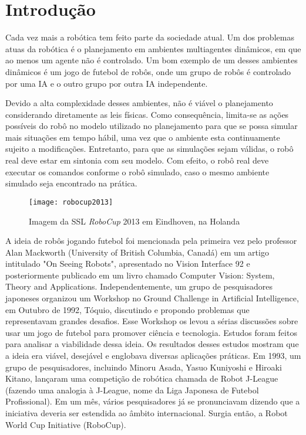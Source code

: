 \chapter{Introdução}

Cada vez mais a robótica tem feito parte da sociedade atual. Um dos problemas
atuas da robótica é o planejamento em ambientes multiagentes dinâmicos, em que
ao menos um agente não é controlado. Um bom exemplo de um desses ambientes
dinâmicos é um jogo de futebol de robôs, onde um grupo de robôs é controlado por
uma IA e o outro grupo por outra IA independente.

Devido a alta complexidade desses ambientes, não é viável o planejamento
considerando diretamente as leis físicas. Como consequência, limita-se as ações
possíveis do robô no modelo utilizado no planejamento para que se possa simular
mais situações em tempo hábil, uma vez que o ambiente esta continuamente sujeito
a modificações. Entretanto, para que as simulações sejam válidas, o robô real
deve estar em sintonia com seu modelo. Com efeito, o robô real deve executar os
comandos conforme o robô simulado, caso o mesmo ambiente simulado seja
encontrado na prática.

\begin{figure}
  \centering
  \texttt{[image: robocup2013]}
  \caption{Imagem da SSL \textit{RoboCup} 2013 em Eindhoven, na Holanda}\label{fig:robocup2013}
\end{figure}

A ideia de robôs jogando futebol foi mencionada pela primeira vez pelo professor
Alan Mackworth (University of British Columbia, Canadá) em um artigo intitulado
"On Seeing Robots", apresentado no Vision Interface 92 e posteriormente
publicado em um livro chamado Computer Vision: System, Theory and Applications.
Independentemente, um grupo de pesquisadores japoneses organizou um Workshop no
Ground Challenge in Artificial Intelligence, em Outubro de 1992, Tóquio,
discutindo e propondo problemas que representavam grandes desafios. Esse
Workshop os levou a sérias discussões sobre usar um jogo de futebol para
promover ciência e tecnologia. Estudos foram feitos para analisar a viabilidade
dessa ideia. Os resultados desses estudos mostram que a ideia era viável,
desejável e englobava diversas aplicações práticas. Em 1993, um grupo de
pesquisadores, incluindo Minoru Asada, Yasuo Kuniyoshi e Hiroaki Kitano,
lançaram uma competição de robótica chamada de Robot J-League (fazendo uma
analogia à J-League, nome da Liga Japonesa de Futebol Profissional). Em um mês,
vários pesquisadores já se pronunciavam dizendo que a iniciativa deveria ser
estendida ao âmbito internacional. Surgia então, a Robot World Cup Initiative
(RoboCup).

